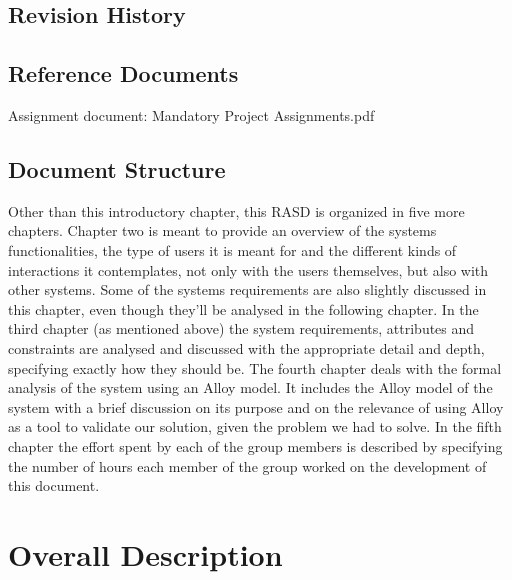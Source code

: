 \documentclass[12pt]{article}
\begin{document}
\subsection{Revision History}

\subsection{Reference Documents}
Assignment document: Mandatory Project Assignments.pdf

\subsection{Document Structure}
Other than this introductory chapter, this RASD is organized in five more chapters. Chapter two is meant to provide an overview of the systems functionalities, the type of users it is meant for and the different kinds of interactions it contemplates, not only with the users themselves, but also with other systems. Some of the systems requirements are also slightly discussed in this chapter, even though they’ll be analysed in the following chapter. In the third chapter (as mentioned above) the system requirements, attributes and constraints are analysed and discussed with the appropriate detail and depth, specifying exactly how they should be.
The fourth chapter deals with the formal analysis of the system using an Alloy model. It includes the Alloy model of the system with a brief discussion on its purpose and on the relevance of using Alloy as a tool to validate our solution, given the problem we had to solve.
In the fifth chapter the effort spent by each of the group members is described by specifying the number of hours each member of the group worked on the development of this document.

\section{Overall Description}
\end{document}
